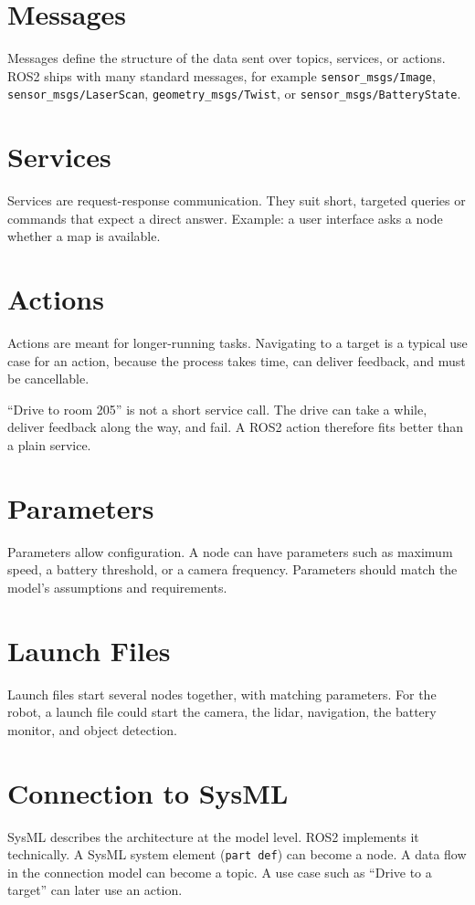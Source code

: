 \section{Messages}
Messages define the structure of the data sent over topics, services, or actions. ROS2 ships with many standard messages, for example \texttt{sensor\_msgs/Image}, \texttt{sensor\_msgs/LaserScan}, \texttt{geometry\_msgs/Twist}, or \texttt{sensor\_msgs/BatteryState}.

\section{Services}
Services are request-response communication. They suit short, targeted queries or commands that expect a direct answer. Example: a user interface asks a node whether a map is available.

\section{Actions}
Actions are meant for longer-running tasks. Navigating to a target is a typical use case for an action, because the process takes time, can deliver feedback, and must be cancellable.

\begin{praxisbox}
\enquote{Drive to room 205} is not a short service call. The drive can take a while, deliver feedback along the way, and fail. A ROS2 action therefore fits better than a plain service.
\end{praxisbox}

\section{Parameters}
Parameters allow configuration. A node can have parameters such as maximum speed, a battery threshold, or a camera frequency. Parameters should match the model's assumptions and requirements.

\section{Launch Files}
Launch files start several nodes together, with matching parameters. For the robot, a launch file could start the camera, the lidar, navigation, the battery monitor, and object detection.

\section{Connection to SysML}
SysML describes the architecture at the model level. ROS2 implements it technically. A SysML system element (\texttt{part def}) can become a node. A data flow in the connection model can become a topic. A use case such as \enquote{Drive to a target} can later use an action.

